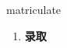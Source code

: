
\begin{frame}
{\huge matriculate}
\begin{center}
\begin{enumerate}\Large
  \item \textbf{录取}
\end{enumerate}
\end{center}
\end{frame}
